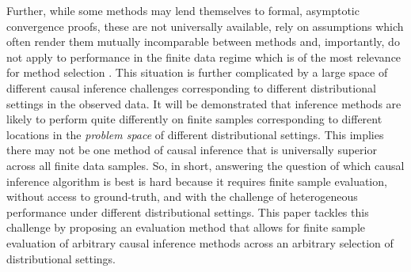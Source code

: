 \documentclass[../main.tex]{subfiles}
\begin{document}
\vspace{\baselineskip}

Further, while some methods may lend themselves to formal, asymptotic convergence proofs, these are not universally available, rely on assumptions which often render them mutually incomparable between methods and, importantly, do not apply to performance in the finite data regime which is of the most relevance for method selection \parencite{Knaus2018MachineEvidence}. This situation is further complicated by a large space of different causal inference challenges corresponding to different distributional settings in the observed data. It will be demonstrated that inference methods are likely to perform quite differently on finite samples corresponding to different locations in the \textit{problem space }of different distributional settings. This implies there may not be one method of causal inference that is universally superior across all finite data samples. So, in short, answering the question of which causal inference algorithm is best is hard because it requires finite sample evaluation, without access to ground-truth, and with the challenge of heterogeneous performance under different distributional settings. This paper tackles this challenge by proposing an evaluation method that allows for finite sample evaluation of arbitrary causal inference methods across an arbitrary selection of distributional settings.\par
\end{document}
